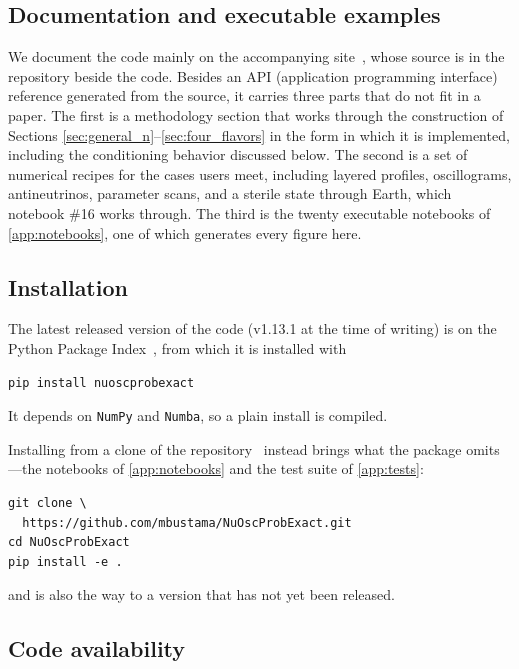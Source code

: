 \documentclass[final,5p,times,twocolumn,sort,compress]{elsarticle}
\begin{document}

\subsection{Documentation and executable examples}
\label{sec:documentation}

We document the code mainly on the accompanying site\ \cite{NuOscProbExactDocs}, whose source is in the repository beside the code.  Besides an API (application programming interface) reference generated from the source, it carries three parts that do not fit in a paper.  The first is a methodology section that works through the construction of Sections \ref{sec:general_n}--\ref{sec:four_flavors} in the form in which it is implemented, including the conditioning behavior discussed below.  The second is a set of numerical recipes for the cases users meet, including layered profiles, oscillograms, antineutrinos, parameter scans, and a sterile state through Earth, which notebook \#16 works through.  The third is the twenty executable notebooks of \ref{app:notebooks}, one of which generates every figure here.  


\subsection{Installation}

The latest released version of the code (v1.13.1 at the time of writing) is on the Python Package Index\ \cite{NuOscProbExactPyPI}, from which it is installed with
\begin{verbatim}
pip install nuoscprobexact
\end{verbatim}
It depends on {\tt NumPy} and {\tt Numba}, so a plain install is compiled.

Installing from a clone of the repository\ \cite{NuOscProbExact} instead brings what the package omits---the notebooks of \ref{app:notebooks} and the test suite of \ref{app:tests}:
\begin{verbatim}
git clone \
  https://github.com/mbustama/NuOscProbExact.git
cd NuOscProbExact
pip install -e .
\end{verbatim}
and is also the way to a version that has not yet been released.


\subsection{Code availability}
\end{document}
